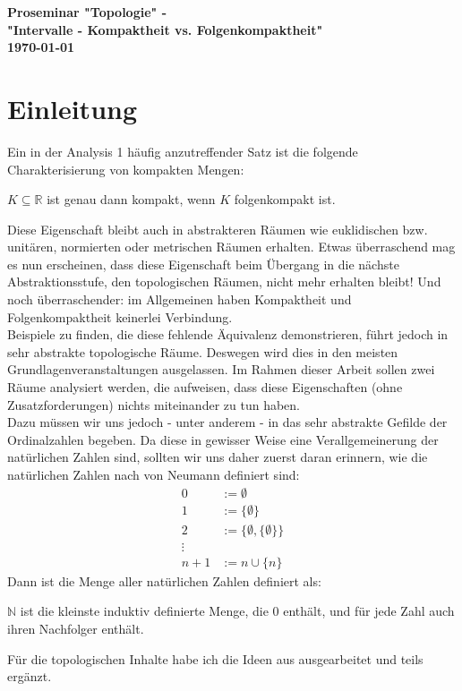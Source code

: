 \documentclass[11pt]{scrartcl}
\newcommand{\R}{\mathbb{R}}
\newcommand{\N}{\mathbb{N}}
\begin{document}
\begin{titlepage}
	\centering
	\Huge
	\textbf{Proseminar "Topologie" - }\\
	\vspace*{1cm}
	\Large
	\textbf{"Intervalle - Kompaktheit vs. Folgenkompaktheit"}\\
	\vspace*{2cm}
	\large
	\textbf{\today}
\end{titlepage}
\section{Einleitung}
Ein in der Analysis 1 häufig anzutreffender Satz ist die folgende Charakterisierung von kompakten Mengen:
\begin{theorem}
	$ K \subseteq \R$ ist genau dann kompakt, wenn $K$ folgenkompakt ist.
\end{theorem}
Diese Eigenschaft bleibt auch in abstrakteren Räumen wie euklidischen bzw. unitären, normierten oder metrischen Räumen erhalten. Etwas überraschend mag es nun erscheinen, dass diese Eigenschaft beim Übergang in die nächste Abstraktionsstufe, den topologischen Räumen, nicht mehr erhalten bleibt! Und noch überraschender: im Allgemeinen haben Kompaktheit und Folgenkompaktheit keinerlei Verbindung.\\
Beispiele zu finden, die diese fehlende Äquivalenz demonstrieren, führt jedoch in sehr abstrakte topologische Räume. Deswegen wird dies in den meisten Grundlagenveranstaltungen ausgelassen. 
Im Rahmen dieser Arbeit sollen zwei Räume analysiert werden, die aufweisen, dass diese Eigenschaften (ohne Zusatzforderungen) nichts miteinander zu
tun haben.\\
Dazu müssen wir uns jedoch - unter anderem - in das sehr abstrakte Gefilde der Ordinalzahlen begeben. Da diese in gewisser Weise eine Verallgemeinerung der natürlichen Zahlen sind, sollten wir uns daher
zuerst daran erinnern, wie die natürlichen Zahlen nach von Neumann definiert sind:
\begin{align*}
	0 &:= \emptyset \\
	1 &:= \{\emptyset\}\\
	2 &:= \{\emptyset, \{\emptyset\}\}\\
	\vdots \\
	n+1 &:= n \cup \{ n\}
\end{align*}
Dann ist die Menge aller natürlichen Zahlen definiert als:
\begin{definition}
	$\N$ ist die kleinste induktiv definierte Menge, die $0$ enthält, und für jede Zahl auch ihren 
	Nachfolger enthält.
\end{definition}
\noindent Für die topologischen Inhalte habe ich die Ideen aus  ausgearbeitet und teils ergänzt.
\end{document}
